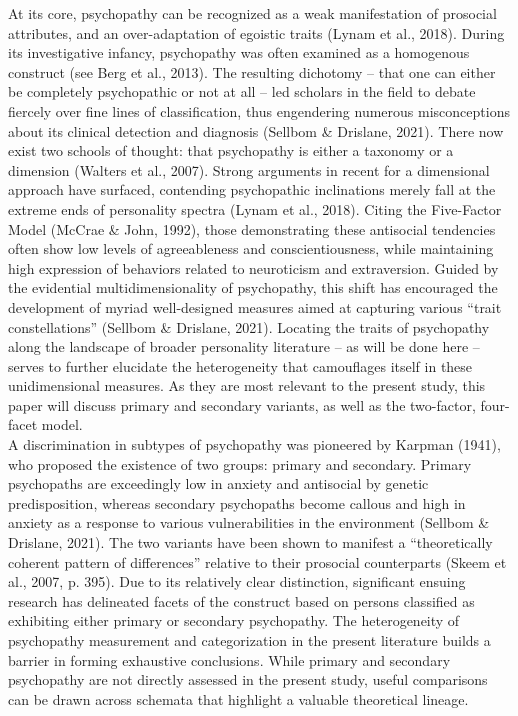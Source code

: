\documentclass[
  man,floatsintext]{apa7}
\begin{document}
At its core, psychopathy can be recognized as a weak manifestation of prosocial attributes, and an over-adaptation of egoistic traits (Lynam et al., 2018). During its investigative infancy, psychopathy was often examined as a homogenous construct (see Berg et al., 2013). The resulting dichotomy -- that one can either be completely psychopathic or not at all -- led scholars in the field to debate fiercely over fine lines of classification, thus engendering numerous misconceptions about its clinical detection and diagnosis (Sellbom \& Drislane, 2021). There now exist two schools of thought: that psychopathy is either a taxonomy or a dimension (Walters et al., 2007). Strong arguments in recent for a dimensional approach have surfaced, contending psychopathic inclinations merely fall at the extreme ends of personality spectra (Lynam et al., 2018). Citing the Five-Factor Model (McCrae \& John, 1992), those demonstrating these antisocial tendencies often show low levels of agreeableness and conscientiousness, while maintaining high expression of behaviors related to neuroticism and extraversion. Guided by the evidential multidimensionality of psychopathy, this shift has encouraged the development of myriad well-designed measures aimed at capturing various ``trait constellations'' (Sellbom \& Drislane, 2021). Locating the traits of psychopathy along the landscape of broader personality literature -- as will be done here -- serves to further elucidate the heterogeneity that camouflages itself in these unidimensional measures. As they are most relevant to the present study, this paper will discuss primary and secondary variants, as well as the two-factor, four-facet model.\\
A discrimination in subtypes of psychopathy was pioneered by Karpman (1941), who proposed the existence of two groups: primary and secondary. Primary psychopaths are exceedingly low in anxiety and antisocial by genetic predisposition, whereas secondary psychopaths become callous and high in anxiety as a response to various vulnerabilities in the environment (Sellbom \& Drislane, 2021). The two variants have been shown to manifest a ``theoretically coherent pattern of differences'' relative to their prosocial counterparts (Skeem et al., 2007, p. 395). Due to its relatively clear distinction, significant ensuing research has delineated facets of the construct based on persons classified as exhibiting either primary or secondary psychopathy. The heterogeneity of psychopathy measurement and categorization in the present literature builds a barrier in forming exhaustive conclusions. While primary and secondary psychopathy are not directly assessed in the present study, useful comparisons can be drawn across schemata that highlight a valuable theoretical lineage.\\
\end{document}
